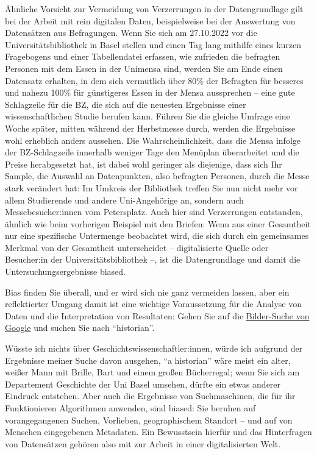 \documentclass[
  letterpaper,
]{book}
\begin{document}
Ähnliche Vorsicht zur Vermeidung von Verzerrungen in der Datengrundlage
gilt bei der Arbeit mit rein digitalen Daten, beispielweise bei der
Auswertung von Datensätzen aus Befragungen. Wenn Sie sich am 27.10.2022
vor die Universitätsbibliothek in Basel stellen und einen Tag lang
mithilfe eines kurzen Fragebogens und einer Tabellendatei erfassen, wie
zufrieden die befragten Personen mit dem Essen in der Unimensa sind,
werden Sie am Ende einen Datensatz erhalten, in dem sich vermutlich über
80\% der Befragten für besseres und nahezu 100\% für günstigeres Essen
in der Mensa aussprechen -- eine gute Schlagzeile für die BZ, die sich
auf die neuesten Ergebnisse einer wissenschaftlichen Studie berufen
kann. Führen Sie die gleiche Umfrage eine Woche später, mitten während
der Herbstmesse durch, werden die Ergebnisse wohl erheblich anders
aussehen. Die Wahrscheinlichkeit, dass die Mensa infolge der
BZ-Schlagzeile innerhalb weniger Tage den Menüplan überarbeitet und die
Preise herabgesetzt hat, ist dabei wohl geringer als diejenige, dass
sich Ihr Sample, die Auswahl an Datenpunkten, also befragten Personen,
durch die Messe stark verändert hat: Im Umkreis der Bibliothek treffen
Sie nun nicht mehr vor allem Studierende und andere Uni-Angehörige an,
sondern auch Messebesucher:innen vom Petersplatz. Auch hier sind
Verzerrungen entstanden, ähnlich wie beim vorherigen Beispiel mit den
Briefen: Wenn aus einer Gesamtheit nur eine spezifische Untermenge
beobachtet wird, die sich durch ein gemeinsames Merkmal von der
Gesamtheit unterscheidet -- digitalisierte Quelle oder Besucher:in der
Universitätsbibliothek --, ist die Datengrundlage und damit die
Untersuchungsergebnisse biased.

Bias finden Sie überall, und er wird sich nie ganz vermeiden lassen,
aber ein reflektierter Umgang damit ist eine wichtige Voraussetzung für
die Analyse von Daten und die Interpretation von Resultaten: Gehen Sie
auf die \href{https://images.google.com/}{Bilder-Suche von Google} und
suchen Sie nach ``historian''.

Wüsste ich nichts über Geschichtswissenschaftler:innen, würde ich
aufgrund der Ergebnisse meiner Suche davon ausgehen, ``a historian''
wäre meist ein alter, weißer Mann mit Brille, Bart und einem großen
Bücherregal; wenn Sie sich am Departement Geschichte der Uni Basel
umsehen, dürfte ein etwas anderer Eindruck entstehen. Aber auch die
Ergebnisse von Suchmaschinen, die für ihr Funktionieren Algorithmen
anwenden, sind biased: Sie beruhen auf vorangegangenen Suchen,
Vorlieben, geographischem Standort -- und auf von Menschen eingegebenen
Metadaten. Ein Bewusstsein hierfür und das Hinterfragen von Datensätzen
gehören also mit zur Arbeit in einer digitalisierten Welt.
\end{document}

